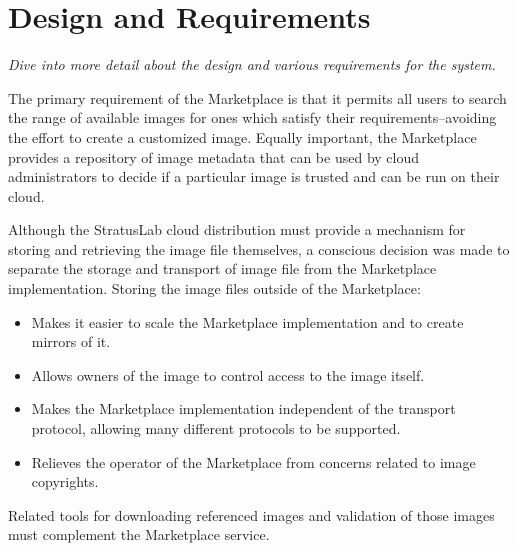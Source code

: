 \section{Design and Requirements}

{\em Dive into more detail about the design and various requirements
  for the system.}

The primary requirement of the Marketplace is that it permits all
users to search the range of available images for ones which satisfy
their requirements--avoiding the effort to create a customized image.
Equally important, the Marketplace provides a repository of image
metadata that can be used by cloud administrators to decide if a
particular image is trusted and can be run on their cloud.

Although the StratusLab cloud distribution must provide a mechanism
for storing and retrieving the image file themselves, a conscious
decision was made to separate the storage and transport of image file
from the Marketplace implementation.  Storing the image files outside
of the Marketplace:
\begin{itemize}
\item Makes it easier to scale the Marketplace implementation and to
  create mirrors of it.
\item Allows owners of the image to control access to the image
  itself.
\item Makes the Marketplace implementation independent of the
  transport protocol, allowing many different protocols to be
  supported.
\item Relieves the operator of the Marketplace from concerns related
  to image copyrights.
\end{itemize}
Related tools for downloading referenced images and validation of
those images must complement the Marketplace service.

